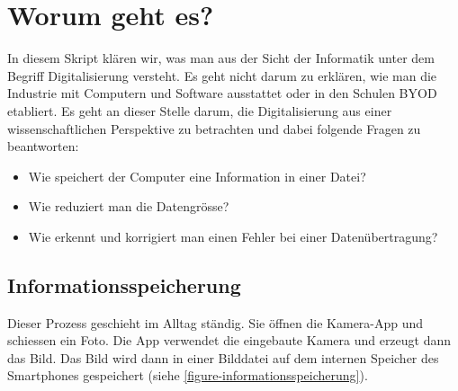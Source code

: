 \toggletrue{image}
\toggletrue{imagehover}



\chapter{Worum geht es?}
\label{chapter-worum-geht-es}

In diesem Skript klären wir, was man aus der Sicht der Informatik unter dem Begriff Digitalisierung versteht. Es geht nicht darum zu erklären, wie man die Industrie mit Computern und Software ausstattet oder in den Schulen \ac{BYOD} etabliert. Es geht an dieser Stelle darum, die Digitalisierung aus einer wissenschaftlichen Perspektive zu betrachten und dabei folgende Fragen zu beantworten:

\begin{itemize}
	\item Wie speichert der Computer eine Information in einer Datei?
	\item Wie reduziert man die Datengrösse?
	\item Wie erkennt und korrigiert man einen Fehler bei einer Datenübertragung?
\end{itemize}

\section{Informationsspeicherung}

Dieser Prozess geschieht im Alltag ständig. Sie öffnen die Kamera-App und schiessen ein Foto. Die App verwendet die eingebaute Kamera und erzeugt dann das Bild. Das Bild wird dann in einer Bilddatei auf dem internen Speicher des Smartphones gespeichert (siehe \autoref{figure-informationsspeicherung}).

